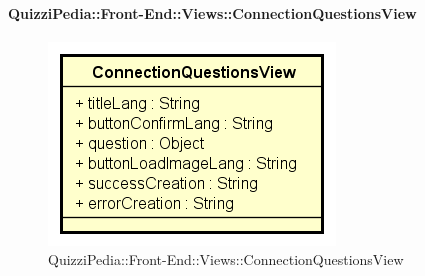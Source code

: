 \paragraph{QuizziPedia::Front-End::Views::ConnectionQuestionsView}
\begin{figure} [ht]
	\centering
	\includegraphics[scale=0.80]{UML/Classi/Front-End/QuizziPedia_Front-end_Views_ConnectionQuestionsView.png}
	\caption{QuizziPedia::Front-End::Views::ConnectionQuestionsView}
\end{figure} \FloatBarrier

